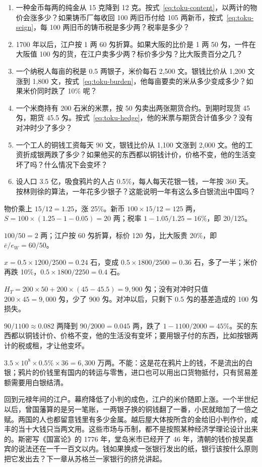 \begin{selfcheck}
\begin{enumerate}
\item 一种金币每两的纯金从 15 克降到 12 克。按式~\eqref{eq:toku-content}，以两计的物价会涨多少？如果铸币厂每收回 100 两旧币付给 105 两新币，按式~\eqref{eq:toku-seign}，每 100 两旧币的铸币税是多少两？税率是多少？
\item 1700 年以后，江户按 1 两 60 匁折算。如果大阪的比价是 1 两 50 匁，一件在大阪值 100 匁的货，在江户卖多少两？标价多少匁？比大阪贵百分之几？
\item 一个纳税人每亩的税是 0.5 两银子，米价每石 2,500 文。银钱比价从 1,200 文涨到 1,800 文，按式~\eqref{eq:toku-burden}，他每亩要卖的米从多少变成多少？如果米价同时跌了 10\% 呢？
\item 一个米商持有 200 石米的米票，按 50 匁卖出两张期货合约。到期时现货 45 匁，期货 45.5 匁。按式~\eqref{eq:toku-hedge}，他的米票与期货合计值多少？没有对冲时少了多少？
\item 一个工人的铜钱工资每天 90 文，银钱比价从 1,100 文涨到 2,000 文。他的工资折成银两跌了多少？如果他买的东西都以铜钱计价，价格不变，他的生活变坏了吗？什么情况下会变坏？
\item 设人口 3.5 亿，吸食鸦片的人占 0.5\%，每人每天花银一钱，一年按 360 天。按林则徐的算法，一年花多少银子？这能说明一年有这么多白银流出中国吗？
\end{enumerate}
\end{selfcheck}

\begin{answers}
\item 物价乘上 $15/12=1.25$，涨 25\%。新币 $100\times15/12=125$ 两，$S=100\times(1.25-1-0.05)=20$ 两；税率 $1-1.05/1.25=16\%$，即 20/125。
\item $100/50=2$ 两；江户按 60 匁折算，标价 120 匁，比大阪贵 20\%，即 $\bar e/e_W=60/50$。
\item $x=0.5\times1200/2500=0.24$ 石，变成 $0.5\times1800/2500=0.36$ 石，多了一半；米价再跌 10\%，$0.5\times1800/2250=0.4$ 石。
\item $H_T=200\times50+200\times(45-45.5)=9{,}900$ 匁；没有对冲时只值 $200\times45=9{,}000$ 匁，少了 900 匁。对冲以后，只剩下 0.5 匁的基差造成的 100 匁损失。
\item $90/1100\approx0.082$ 两降到 $90/2000=0.045$ 两，跌了 $1-1100/2000=45\%$。买的东西都以铜钱计价、价格不变，他的生活没有变坏；要用银子付的东西，比如按银两计的税或租，才让他变坏。
\item $3.5\times10^8\times0.5\%\times36=6{,}300$ 万两。不能：这是花在鸦片上的钱，不是流出的白银；鸦片的价钱里有国内的转运与零售，进口也可以用出口货物抵付，只有贸易差额需要用白银结清。
\end{answers}

回到元禄年间的江户。幕府降低了小判的成色，江户的米价随即上涨。一个半世纪以后，曾国藩算的是另一笔账，一两银子换的铜钱翻了一番，小民就暗加了一倍之赋。两国的人也都留意钱里有多少金属。越后屋大体按所含的金给旧小判作价，咸丰的当十大钱只当两文用。这些市场与币制，都不是按照某种经济学理论设计出来的。斯密写《国富论》的 1776 年，堂岛米市已经开了 46 年，清朝的钱价按吴嘉宾的说法还在一千一百文以内。钱如果换成一张银行发出的纸，银行该按什么原则把它发出去？下一章从苏格兰一家银行的挤兑讲起。
